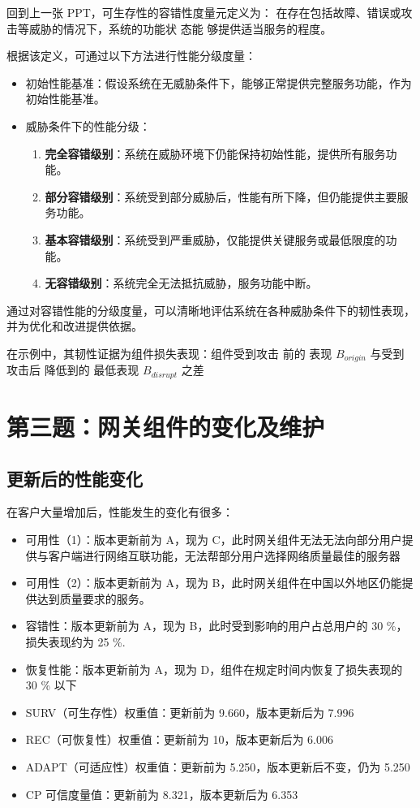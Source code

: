 \documentclass[14pt,a4paper,UTF8,twoside]{article}
\begin{document}
回到上一张 PPT，可生存性的容错性度量元定义为：
在存在包括故障、错误或攻击等威胁的情况下，系统的功能状
态能 够提供适当服务的程度。

根据该定义，可通过以下方法进行性能分级度量：
\begin{itemize}
    \item 初始性能基准：假设系统在无威胁条件下，能够正常提供完整服务功能，作为初始性能基准。
    \item 威胁条件下的性能分级：
    \begin{enumerate}
        \item \textbf{完全容错级别}：系统在威胁环境下仍能保持初始性能，提供所有服务功能。
        \item \textbf{部分容错级别}：系统受到部分威胁后，性能有所下降，但仍能提供主要服务功能。
        \item \textbf{基本容错级别}：系统受到严重威胁，仅能提供关键服务或最低限度的功能。
        \item \textbf{无容错级别}：系统完全无法抵抗威胁，服务功能中断。
    \end{enumerate}
\end{itemize}

通过对容错性能的分级度量，可以清晰地评估系统在各种威胁条件下的韧性表现，并为优化和改进提供依据。

在示例中，其韧性证据为组件损失表现：组件受到攻击
前的 表现 $B_{origin}$ 与受到攻击后
降低到的 最低表现 $B_{disrupt}$ 之差

\section{第三题：网关组件的变化及维护}

\subsection{更新后的性能变化}

在客户大量增加后，性能发生的变化有很多：

\begin{itemize}
    \item 可用性（1）：版本更新前为 A，现为 C，此时网关组件无法无法向部分用户提供与客户端进行网络互联功能，无法帮部分用户选择网络质量最佳的服务器
    \item 可用性（2）：版本更新前为 A，现为 B，此时网关组件在中国以外地区仍能提供达到质量要求的服务。
    \item 容错性：版本更新前为 A，现为 B，此时受到影响的用户占总用户的 30 \%，损失表现约为 25 \%.
    \item 恢复性能：版本更新前为 A，现为 D，组件在规定时间内恢复了损失表现的 30 \% 以下
    \item SURV（可生存性）权重值：更新前为 9.660，版本更新后为 7.996
    \item REC（可恢复性）权重值：更新前为 10，版本更新后为 6.006
    \item ADAPT（可适应性）权重值：更新前为 5.250，版本更新后不变，仍为 5.250
    \item CP 可信度量值：更新前为 8.321，版本更新后为 6.353
\end{itemize}
\end{document}
